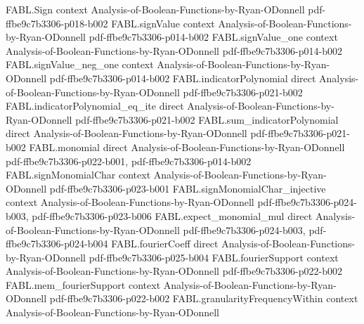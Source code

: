 \begin{theorem}
\label{FABL.noiseOperator_middleLayerIndicator_allOne_eq_groupedFourierSum}
\leanok
{}
\proofstep
  {FABL.Sign}
  {context}
  {Analysis-of-Boolean-Functions-by-Ryan-ODonnell}
  {pdf-ffbe9c7b3306-p018-b002}
\proofstep
  {FABL.signValue}
  {context}
  {Analysis-of-Boolean-Functions-by-Ryan-ODonnell}
  {pdf-ffbe9c7b3306-p014-b002}
\proofstep
  {FABL.signValue_one}
  {context}
  {Analysis-of-Boolean-Functions-by-Ryan-ODonnell}
  {pdf-ffbe9c7b3306-p014-b002}
\proofstep
  {FABL.signValue_neg_one}
  {context}
  {Analysis-of-Boolean-Functions-by-Ryan-ODonnell}
  {pdf-ffbe9c7b3306-p014-b002}
\proofstep
  {FABL.indicatorPolynomial}
  {direct}
  {Analysis-of-Boolean-Functions-by-Ryan-ODonnell}
  {pdf-ffbe9c7b3306-p021-b002}
\proofstep
  {FABL.indicatorPolynomial_eq_ite}
  {direct}
  {Analysis-of-Boolean-Functions-by-Ryan-ODonnell}
  {pdf-ffbe9c7b3306-p021-b002}
\proofstep
  {FABL.sum_indicatorPolynomial}
  {direct}
  {Analysis-of-Boolean-Functions-by-Ryan-ODonnell}
  {pdf-ffbe9c7b3306-p021-b002}
\proofstep
  {FABL.monomial}
  {direct}
  {Analysis-of-Boolean-Functions-by-Ryan-ODonnell}
  {pdf-ffbe9c7b3306-p022-b001,
    pdf-ffbe9c7b3306-p014-b002}
\proofstep
  {FABL.signMonomialChar}
  {context}
  {Analysis-of-Boolean-Functions-by-Ryan-ODonnell}
  {pdf-ffbe9c7b3306-p023-b001}
\proofstep
  {FABL.signMonomialChar_injective}
  {context}
  {Analysis-of-Boolean-Functions-by-Ryan-ODonnell}
  {pdf-ffbe9c7b3306-p024-b003,
    pdf-ffbe9c7b3306-p023-b006}
\proofstep
  {FABL.expect_monomial_mul}
  {direct}
  {Analysis-of-Boolean-Functions-by-Ryan-ODonnell}
  {pdf-ffbe9c7b3306-p024-b003,
    pdf-ffbe9c7b3306-p024-b004}
\proofstep
  {FABL.fourierCoeff}
  {direct}
  {Analysis-of-Boolean-Functions-by-Ryan-ODonnell}
  {pdf-ffbe9c7b3306-p025-b004}
\proofstep
  {FABL.fourierSupport}
  {context}
  {Analysis-of-Boolean-Functions-by-Ryan-ODonnell}
  {pdf-ffbe9c7b3306-p022-b002}
\proofstep
  {FABL.mem_fourierSupport}
  {context}
  {Analysis-of-Boolean-Functions-by-Ryan-ODonnell}
  {pdf-ffbe9c7b3306-p022-b002}
\proofstep
  {FABL.granularityFrequencyWithin}
  {context}
  {Analysis-of-Boolean-Functions-by-Ryan-ODonnell}

\end{theorem}
